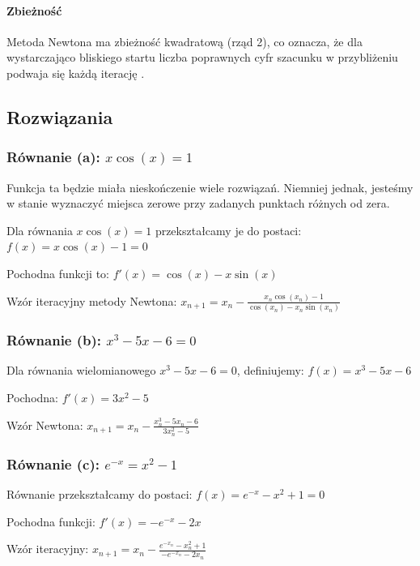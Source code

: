 \documentclass[a4paper,12pt]{article}
\begin{document}
    \paragraph{Zbieżność}
    Metoda Newtona ma zbieżność kwadratową (rząd 2), co oznacza, że dla wystarczająco bliskiego startu liczba poprawnych cyfr szacunku w przybliżeniu podwaja się każdą iterację \cite{weisstein_newton}.
    
    \subsection{Rozwiązania}
    
    \subsubsection{Równanie (a): $x \cos(x) = 1$}
    
    Funkcja ta będzie miała nieskończenie wiele rozwiązań. Niemniej jednak, jesteśmy w stanie wyznaczyć miejsca zerowe przy zadanych punktach różnych od zera.
    
    Dla równania $x \cos(x) = 1$ przekształcamy je do postaci:
    $f(x) = x \cos(x) - 1 = 0$
    
    Pochodna funkcji to:
    $f'(x) = \cos(x) - x \sin(x)$
    
    Wzór iteracyjny metody Newtona:
    $x_{n+1} = x_n - \frac{x_n \cos(x_n) - 1}{\cos(x_n) - x_n \sin(x_n)}$
    
    \subsubsection{Równanie (b): $x^3 - 5x - 6 = 0$}
    
    Dla równania wielomianowego $x^3 - 5x - 6 = 0$, definiujemy:
    $f(x) = x^3 - 5x - 6$
    
    Pochodna:
    $f'(x) = 3x^2 - 5$
    
    Wzór Newtona:
    $x_{n+1} = x_n - \frac{x_n^3 - 5x_n - 6}{3x_n^2 - 5}$
    
    \subsubsection{Równanie (c): $e^{-x} = x^2 - 1$}
    
    Równanie przekształcamy do postaci:
    $f(x) = e^{-x} - x^2 + 1 = 0$
    
    Pochodna funkcji:
    $f'(x) = -e^{-x} - 2x$
    
    Wzór iteracyjny:
    $x_{n+1} = x_n - \frac{e^{-x_n} - x_n^2 + 1}{-e^{-x_n} - 2x_n}$
    
\end{document}
